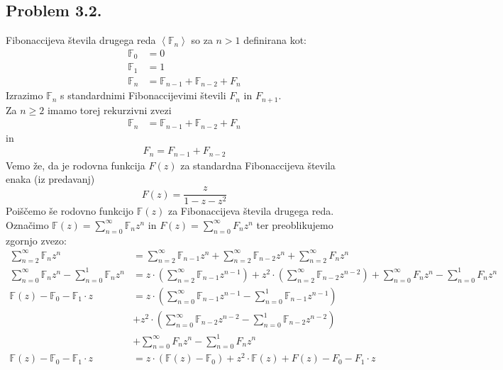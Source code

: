 \documentclass[a4paper,11pt]{article}
\begin{document}
\subsection*{Problem 3.2.}
Fibonaccijeva števila drugega reda $\left< \mathbb{F}_n \right>$ so za $n > 1$ definirana kot:
\begin{align*}
    \mathbb{F}_0 &= 0
    \\
    \mathbb{F}_1 &= 1
    \\
    \mathbb{F}_n &= \mathbb{F}_{n - 1} + \mathbb{F}_{n - 2} + F_n 
\end{align*}
Izrazimo $\mathbb{F}_n$ s standardnimi Fibonaccijevimi števili $F_n$ in $F_{n + 1}$.
\\
Za $n \geq 2$ imamo torej rekurzivni zvezi
\begin{align}
    \mathbb{F}_n &= \mathbb{F}_{n - 1} + \mathbb{F}_{n - 2} + F_n
\end{align}
in
\begin{align*}
    F_n = F_{n - 1} + F_{n - 2}
\end{align*}
Vemo že, da je rodovna funkcija $F(z)$ za standardna Fibonaccijeva števila enaka (iz predavanj)
$$
F(z) = \frac{z}{1 - z - z^2}
$$
Poiščemo še rodovno funkcijo $\mathbb{F}(z)$ za Fibonaccijeva števila drugega reda. Označimo $\mathbb{F}(z) = \sum_{n = 0}^{\infty} \mathbb{F}_n z^n$ in $F(z) = \sum_{n = 0}^{\infty} F_n z^n$ ter preoblikujemo zgornjo zvezo:
\begin{align*}
    \sum_{n = 2}^{\infty} \mathbb{F}_n z^n &= \sum_{n = 2}^{\infty} \mathbb{F}_{n - 1} z^n + \sum_{n = 2}^{\infty} \mathbb{F}_{n - 2} z^n + \sum_{n = 2}^{\infty} F_n z^n
    \\
    \sum_{n = 0}^{\infty} \mathbb{F}_n z^n - \sum_{n = 0}^{1} \mathbb{F}_n z^n &= z \cdot \left( \sum_{n = 2}^{\infty} \mathbb{F}_{n - 1} z^{n - 1} \right) + z^2 \cdot \left( \sum_{n = 2}^{\infty} \mathbb{F}_{n - 2} z^{n - 2} \right) + \sum_{n = 0}^{\infty} F_n z^n - \sum_{n = 0}^{1} F_n z^n
    \\
    \mathbb{F}(z) - \mathbb{F}_0 - \mathbb{F}_1 \cdot z &= z \cdot \left( \sum_{n = 0}^{\infty} \mathbb{F}_{n - 1}z^{n - 1} - \sum_{n = 0}^{1} \mathbb{F}_{n - 1} z^{n - 1} \right) 
    \\
    &+ z^2 \cdot \left( \sum_{n = 0}^{\infty} \mathbb{F}_{n - 2}z^{n - 2} - \sum_{n = 0}^{1} \mathbb{F}_{n - 2} z^{n - 2} \right) 
    \\
    &+ \sum_{n = 0}^{\infty} F_n z^n - \sum_{n = 0}^{1} F_n z^n
    \\
    \mathbb{F}(z) - \mathbb{F}_0 - \mathbb{F}_1 \cdot z &= 
    z \cdot \left( \mathbb{F}(z) - \mathbb{F}_0 \right) 
    + z^2 \cdot \mathbb{F}(z) 
    + F(z) - F_0 - F_1 \cdot z
\end{align*}
\end{document}
